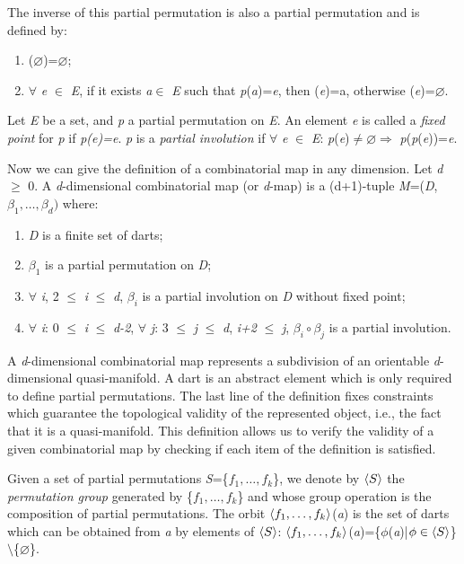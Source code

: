 The inverse \pmun{} of this partial permutation is also a partial
permutation and is defined by:
\begin{enumerate}
\item \pmun{}($\varnothing$)=$\varnothing$;
\item $\forall$ \emph{e} $\in$ \emph{E}, if it exists \emph{a}$\in$ \emph{E} such that \emph{p}(\emph{a})=\emph{e},
  then \pmun{}(\emph{e})=a, otherwise \pmun{}(\emph{e})=$\varnothing$.
\end{enumerate}

Let \emph{E} be a set, and \emph{p} a partial permutation on \emph{E}.  An element
\emph{e} is called a \emph{fixed point} for \emph{p} if \emph{p(e)=e}.  \emph{p} is a
\emph{partial involution} if $\forall$ \emph{e} $\in$ \emph{E}: \emph{p}(\emph{e})$\neq \varnothing
\Rightarrow$ \emph{p}(\emph{p}(\emph{e}))=\emph{e}.

Now we can give the definition of a combinatorial map in any dimension.
Let \emph{d} $\geq$ 0. A \emph{d}-dimensional combinatorial map (or 
\emph{d}-map) is a (d+1)-tuple \emph{M}=(\emph{D},$\beta_1,\ldots,\beta_d)$ 
where:
\begin{enumerate}
\item \emph{D} is a finite set of darts;
\item $\beta_1$ is a partial permutation on \emph{D};
\item $\forall$ \emph{i}, 2 $\leq$ \emph{i} $\leq$ \emph{d}, $\beta_i$ is a
  partial involution on \emph{D} without fixed point;
\item\label{cond-composition} $\forall$ \emph{i}: 0 $\leq$ \emph{i} $\leq$ \emph{d-2},
  $\forall$ \emph{j}: 3 $\leq$ \emph{j} $\leq$ \emph{d}, \emph{i+2} $\leq$ \emph{j},
  $\beta_{i}\circ\beta_{j}$ is a partial involution.
\end{enumerate}

A \emph{d}-dimensional combinatorial map represents a subdivision of an
orientable \emph{d}-dimensional quasi-manifold. A dart is an abstract element
which is only required to define partial permutations. The last line of
the definition fixes constraints which guarantee the topological
validity of the represented object, i.e., the fact that it is a
quasi-manifold. This definition allows us to verify the validity of a
given combinatorial map by checking if each item of the definition is
satisfied.

Given a set of partial permutations \emph{S}=\{$f_1,\ldots,f_k$\}, we denote
by $\langle{}S\rangle{}$ the \emph{permutation group} generated by
\{$f_1,\ldots,f_k$\}	 and whose group operation is the composition of
partial permutations.  The orbit $\langle{}f_1,\ldots,f_k\rangle{}$(\emph{a}) is the set
of darts which can be obtained from \emph{a} by elements of $\langle{}S\rangle{}$:
$\langle{}f_1,\ldots,f_k\rangle{}$(\emph{a})=\{$\phi$(\emph{a})|$\phi \in \langle{}S\rangle{}$\}$\setminus$\{$\varnothing$\}.

